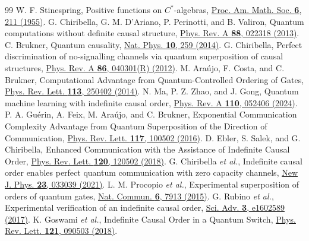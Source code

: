 \documentclass[aps,prl,reprint,superscriptaddress,longbibliography,bibnotes,floatfix]{revtex4-2}
\begin{document}
\begin{thebibliography}{99}
 W. F. Stinespring, Positive functions on $C^*$-algebras, \href{https://doi.org/10.1090/S0002-9939-1955-0069403-4}{Proc. Am. Math. Soc. \textbf{6}, 211 (1955)}.
 G. Chiribella, G. M. D'Ariano, P. Perinotti, and B. Valiron, Quantum computations without definite causal structure, \href{https://doi.org/10.1103/PhysRevA.88.022318}{Phys. Rev. A \textbf{88}, 022318 (2013)}.
 C. Brukner, Quantum causality, \href{https://doi.org/10.1038/nphys2930}{Nat. Phys. \textbf{10}, 259 (2014)}.
 G. Chiribella, Perfect discrimination of no-signalling channels via quantum superposition of causal structures, \href{https://doi.org/10.1103/PhysRevA.86.040301}{Phys. Rev. A \textbf{86}, 040301(R) (2012)}.
 M. Ara\'{u}jo, F. Costa, and C. Brukner, Computational Advantage from Quantum-Controlled Ordering of Gates, \href{https://doi.org/10.1103/PhysRevLett.113.250402}{Phys. Rev. Lett. \textbf{113}, 250402 (2014)}.
 N. Ma, P. Z. Zhao, and J. Gong, Quantum machine learning with indefinite causal order, \href{https://doi.org/10.1103/PhysRevA.110.052406}{Phys. Rev. A \textbf{110}, 052406 (2024)}.
 P. A. Gu\'{e}rin, A. Feix, M. Ara\'{u}jo, and C. Brukner, Exponential Communication Complexity Advantage from Quantum Superposition of the Direction of Communication, \href{https://doi.org/10.1103/PhysRevLett.117.100502}{Phys. Rev. Lett. \textbf{117}, 100502 (2016)}.
 D. Ebler, S. Salek, and G. Chiribella, Enhanced Communication with the Assistance of Indefinite Causal Order, \href{https://doi.org/10.1103/PhysRevLett.120.120502}{Phys. Rev. Lett. \textbf{120}, 120502 (2018)}.
 G. Chiribella \emph{et al.}, Indefinite causal order enables perfect quantum communication with zero capacity channels, \href{https://doi.org/10.1088/1367-2630/abe7a0}{New J. Phys. \textbf{23}, 033039 (2021)}.
 L. M. Procopio \emph{et al.}, Experimental superposition of orders of quantum gates, \href{https://doi.org/10.1038/ncomms8913}{Nat. Commun. \textbf{6}, 7913 (2015)}.
 G. Rubino \emph{et al.}, Experimental verification of an indefinite causal order, \href{https://doi.org/10.1126/sciadv.1602589}{Sci. Adv. \textbf{3}, e1602589 (2017)}.
 K. Goswami \emph{et al.}, Indefinite Causal Order in a Quantum Switch, \href{https://doi.org/10.1103/PhysRevLett.121.090503}{Phys. Rev. Lett. \textbf{121}, 090503 (2018)}.

\end{thebibliography}
\end{document}
